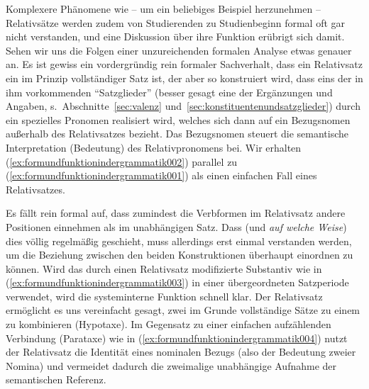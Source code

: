Komplexere Phänomene wie -- um ein beliebiges Beispiel herzunehmen -- Relativsätze werden zudem von Studierenden zu Studienbeginn formal oft gar nicht verstanden, und eine Diskussion über ihre Funktion erübrigt sich damit.
Sehen wir uns die Folgen einer unzureichenden formalen Analyse etwas genauer an.
Es ist gewiss ein vordergründig rein formaler Sachverhalt, dass ein Relativsatz ein im Prinzip vollständiger Satz ist, der aber so konstruiert wird, dass eins der in ihm vorkommenden "`Satzglieder"' (besser gesagt eine der Ergänzungen und Angaben, s.\ Abschnitte~\ref{sec:valenz} und~\ref{sec:konstituentenundsatzglieder}) durch ein spezielles Pronomen realisiert wird, welches sich dann auf ein Bezugsnomen außerhalb des Relativsatzes bezieht.
Das Bezugsnomen steuert die semantische Interpretation (Bedeutung) des Relativpronomens bei.
Wir erhalten (\ref{ex:formundfunktionindergrammatik002}) parallel zu (\ref{ex:formundfunktionindergrammatik001}) als einen einfachen Fall eines Relativsatzes.

\begin{exe}
  \ex
  \begin{xlist}
  \end{xlist}
\end{exe}

Es fällt rein formal auf, dass zumindest die Verbformen im Relativsatz andere Positionen einnehmen als im unabhängigen Satz.
Dass (und \textit{auf welche Weise}) dies völlig regelmäßig geschieht, muss allerdings erst einmal verstanden werden, um die Beziehung zwischen den beiden Konstruktionen überhaupt einordnen zu können.
Wird das durch einen Relativsatz modifizierte Substantiv wie in (\ref{ex:formundfunktionindergrammatik003}) in einer übergeordneten Satzperiode verwendet, wird die systeminterne Funktion schnell klar.
Der Relativsatz ermöglicht es uns vereinfacht gesagt, zwei im Grunde vollständige Sätze zu einem zu kombinieren (Hypotaxe).
Im Gegensatz zu einer einfachen aufzählenden Verbindung (Parataxe) wie in (\ref{ex:formundfunktionindergrammatik004}) nutzt der Relativsatz die Identität eines nominalen Bezugs (also der Bedeutung zweier Nomina) und vermeidet dadurch die zweimalige unabhängige Aufnahme der semantischen Referenz.

\begin{exe}
\ex
\begin{xlist}
\end{xlist}
\end{exe}

